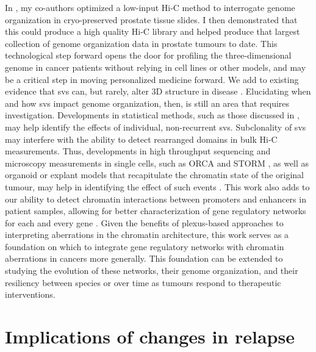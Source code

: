 In , my co-authors optimized a low-input Hi-C method to interrogate genome organization in cryo-preserved prostate tissue slides.
I then demonstrated that this could produce a high quality Hi-C library and helped produce that largest collection of genome organization data in prostate tumours to date.
This technological step forward opens the door for profiling the three-dimensional genome in cancer patients without relying in cell lines or other models, and may be a critical step in moving personalized medicine forward.
We add to existing evidence that \glspl{sv} can, but rarely, alter 3D structure in disease \cite{ghavi-helmHighlyRearrangedChromosomes2019,oudelaarRelationshipGenomeStructure2020,despangFunctionalDissectionSox92019,williamsonDevelopmentallyRegulatedShh2019,dixonIntegrativeDetectionAnalysis2018,akdemirDisruptionChromatinFolding2020,liPatternsSomaticStructural2020,iyyankiSubtypeassociatedEpigenomicLandscape2021}.
Elucidating when and how \glspl{sv} impact genome organization, then, is still an area that requires investigation.
Developments in statistical methods, such as those discussed in , may help identify the effects of individual, non-recurrent \glspl{sv}.
Subclonality of \glspl{sv} may interfere with the ability to detect rearranged domains in bulk Hi-C measurements.
Thus, developments in high throughput sequencing and microscopy measurements in single cells, such as ORCA \cite{mateoVisualizingDNAFolding2019} and STORM \cite{batesStochasticOpticalReconstruction2013}, as well as organoid or explant models that recapitulate the chromatin state of the original tumour, may help in identifying the effect of such events \cite{zanoniModelingNeoplasticDisease2020}.
This work also adds to our ability to detect chromatin interactions between promoters and enhancers in patient samples, allowing for better characterization of gene regulatory networks for each and every gene \cite{gasperiniComprehensiveCatalogueValidated2020,oudelaarRelationshipGenomeStructure2020,wangEngineering3DGenome2021}.
Given the benefits of plexus-based approaches to interpreting aberrations in the chromatin architecture, this work serves as a foundation on which to integrate gene regulatory networks with chromatin aberrations in cancers more generally.
This foundation can be extended to studying the evolution of these networks, their genome organization, and their resiliency between species or over time as tumours respond to therapeutic interventions.

\section{Implications of  changes in relapse}

